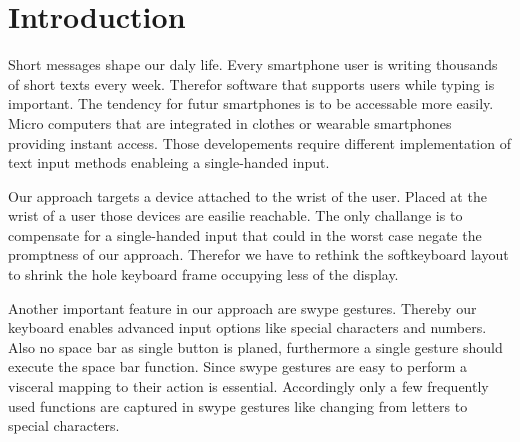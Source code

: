 \documentclass{acm_proc_article-sp}
\begin{document}

\section{Introduction}
{S}hort messages shape our daly life. Every smartphone user is writing thousands of short texts every week. Therefor software that supports users while typing is important. The tendency for futur smartphones is to be accessable more easily. Micro computers that are integrated in clothes or wearable smartphones providing instant access. Those developements require different implementation of text input methods enableing a single-handed input.

Our approach targets a device attached to the wrist of the user. Placed at the wrist of a user those devices are easilie reachable. The only challange is to compensate for a single-handed input that could in the worst case negate the promptness of our approach. Therefor we have to rethink the softkeyboard layout to shrink the hole keyboard frame occupying less of the display.

Another important feature in our approach are swype gestures. Thereby our keyboard enables advanced input options like special characters and numbers. Also no space bar as single button is planed, furthermore a single gesture should execute the space bar function. Since swype gestures are easy to perform a visceral mapping to their action is essential. Accordingly only a few frequently used functions are captured in swype gestures like changing from letters to special characters. 
\end{document}
